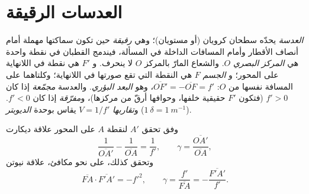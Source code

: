 \section{العدسات الرقيقة}

\begin{definition}\label{def:b1:mirrors-thin-lenses:lens}
\emph{العدسة}  يحدّه سطحان كرويان (أو مستويان)؛ وهي
\emph{رقيقة} حين تكون سماكتها مهملة أمام أنصاف الأقطار وأمام المسافات
الداخلة في المسألة، فيندمج القطبان في نقطة واحدة هي \emph{المركز
البصري} $O$. والشعاع المارّ بالمركز $O$ لا ينحرف. و\emph{ } $F'$
هي  نقطة في اللانهاية على المحور؛ و\emph{ الجسم} $F$ هي
النقطة التي تقع صورتها في اللانهاية؛ وكلتاهما على المسافة نفسها من
$O$: $\overline{OF'} = -\overline{OF} = f'$، وهو \emph{البعد البؤري}.
والعدسة \emph{مجمّعة} إذا كان $f' > 0$ (فتكون $F'$ حقيقية خلفها، وحوافها
أرقّ من مركزها)، و\emph{مفرّقة} إذا كان $f' < 0$. و\emph{تقاربها}
$V = 1/f'$ يقاس بوحدة \emph{الديوبتر}
($\qty{1}{\delta} = \qty{1}{m^{-1}}$).
\end{definition}

\begin{theorem}\label{thm:b1:mirrors-thin-lenses:lensconj}
وفق  تحقق  $A'$ لنقطة $A$ على المحور علاقة
ديكارت
\[
\frac{1}{\overline{OA'}} - \frac{1}{\overline{OA}} = \frac{1}{f'},
\qquad
\gamma = \frac{\overline{OA'}}{\overline{OA}},
\]
وتحقق كذلك، على نحو مكافئ، علاقة نيوتن
\[
\overline{FA}\cdot\overline{F'A'} = -f'^2,
\qquad
\gamma = \frac{f'}{\overline{FA}} = -\frac{\overline{F'A'}}{f'} .
\]
\end{theorem}

